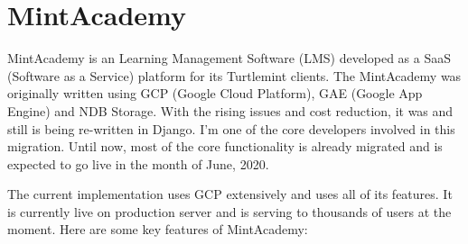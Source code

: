 \section{MintAcademy}

MintAcademy is an Learning Management Software (LMS) developed as a SaaS
(Software as a Service) platform for its Turtlemint clients. The MintAcademy
was originally written using GCP (Google Cloud Platform), GAE (Google App Engine)
and NDB Storage. With the rising issues and cost reduction, it was and still
is being re-written in Django. I'm one of the core developers involved in this
migration. Until now, most of the core functionality is already migrated
and is expected to go live in the month of June, 2020.

The current implementation uses GCP extensively and uses all of its features.
It is currently live on production server and is serving to thousands of users
at the moment. Here are some key features of MintAcademy:

